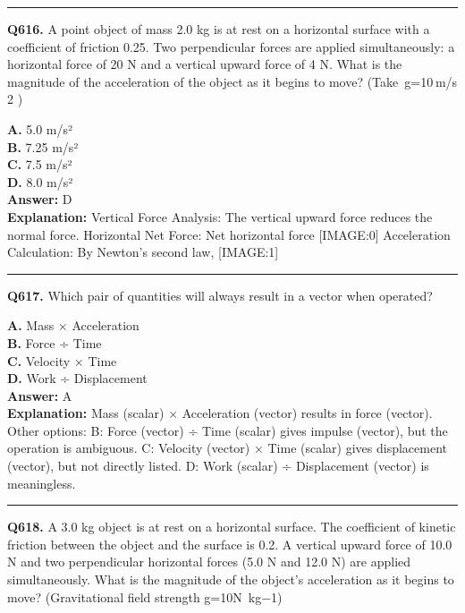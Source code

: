 \documentclass[12pt]{article}
\begin{document}
\hrule
\vspace{1em}


\noindent
\textbf{Q616.} A point object of mass 2.0 kg is at rest on a horizontal surface with a coefficient of friction 0.25. Two perpendicular forces are applied simultaneously: a horizontal force of 20 N and a vertical upward force of 4 N. What is the magnitude of the acceleration of the object as it begins to move? (Take g=10 m/s
2
)



\textbf{A.} 5.0 m/s² \\
\textbf{B.} 7.25 m/s² \\
\textbf{C.} 7.5 m/s² \\
\textbf{D.} 8.0 m/s² \\

\textbf{Answer:} D \\
\textbf{Explanation:} Vertical Force Analysis: The vertical upward force reduces the normal force.
Horizontal Net Force: Net horizontal force
[IMAGE:0]
Acceleration Calculation: By Newton’s second law,
[IMAGE:1]

\hrule
\vspace{1em}


\noindent
\textbf{Q617.} Which pair of quantities will always result in a vector when operated?



\textbf{A.} Mass × Acceleration \\
\textbf{B.} Force ÷ Time \\
\textbf{C.} Velocity × Time \\
\textbf{D.} Work ÷ Displacement \\

\textbf{Answer:} A \\
\textbf{Explanation:} Mass (scalar) × Acceleration (vector) results in force (vector). Other options:
\cdot 
B: Force (vector) ÷ Time (scalar) gives impulse (vector), but the operation is ambiguous.
\cdot 
C: Velocity (vector) × Time (scalar) gives displacement (vector), but not directly listed.
\cdot 
D: Work (scalar) ÷ Displacement (vector) is meaningless.

\hrule
\vspace{1em}


\noindent
\textbf{Q618.} A 3.0 kg object is at rest on a horizontal surface. The coefficient of kinetic friction between the object and the surface is 0.2. A vertical upward force of 10.0 N and two perpendicular horizontal forces (5.0 N and 12.0 N) are applied simultaneously. What is the magnitude of the object's acceleration as it begins to move? (Gravitational field strength g=10N kg−1)
\end{document}
